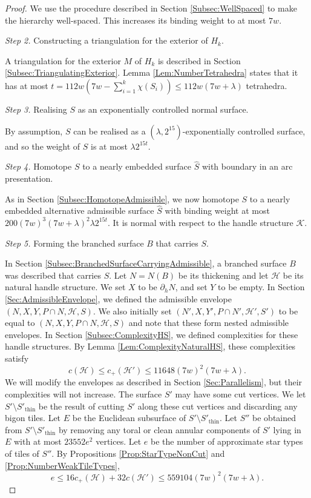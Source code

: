 \documentclass[oneside]{amsart}
\numberwithin{equation}{section}
\theoremstyle{plain}
\theoremstyle{definition}
\begin{document}
\begin{proof}
We use the procedure described in Section \ref{Subsec:WellSpaced} to make the hierarchy well-spaced.
This increases its binding weight to at most $7w$.

\medskip
\emph{Step 2.} Constructing a triangulation for the exterior of $H_k$.

A triangulation for the exterior $M$ of $H_k$ is described in Section \ref{Subsec:TriangulatingExterior}. Lemma \ref{Lem:NumberTetrahedra} states
that it has at most $t = 112 w (7w - \sum_{i=1}^k \chi(S_i) ) \leq 112 w (7w + \lambda)$ tetrahedra.

\medskip
\emph{Step 3.} Realising $S$ as an exponentially controlled normal surface.

By assumption, $S$ can be realised as a $(\lambda,2^{15})$-exponentially controlled surface,
and so the weight of $S$ is at most $\lambda 2^{15t}$.

\medskip
\emph{Step 4.} Homotope $S$ to a nearly embedded surface $\hat S$ with boundary
in an arc presentation.

As in Section \ref{Subsec:HomotopeAdmissible}, we now homotope $S$ to a nearly embedded alternative admissible surface $\hat S$
with binding weight at most $200(7w)^3 (7w + \lambda)^2 \lambda 2^{15t}$. It is normal with respect to the
handle structure $\mathcal{K}$.

\medskip
\emph{Step 5.} Forming the branched surface $B$ that carries $S$.

In Section \ref{Subsec:BranchedSurfaceCarryingAdmissible}, a branched surface $B$ was described that carries $S$.
Let $N = N(B)$ be its thickening and let $\mathcal{H}$ be its natural handle structure.
We set $X$ to be $\partial_h N$, and set $Y$ to be empty. In Section \ref{Sec:AdmissibleEnvelope},
we defined the admissible envelope $(N, X, Y, P \cap N, \mathcal{H}, S)$.
We also initially set $(N', X, Y', P \cap N', \mathcal{H}', S')$ to be equal to 
$(N, X, Y, P \cap N, \mathcal{H}, S)$ and note that these form nested admissible envelopes.
In Section \ref{Subsec:ComplexityHS}, we defined complexities for these handle structures.
By Lemma \ref{Lem:ComplexityNaturalHS}, these complexities satisfy
$$c(\mathcal{H}) \leq c_+(\mathcal{H}') \leq 11648 (7w)^2(7w+\lambda).$$
We will modify the envelopes as described in Section \ref{Sec:Parallelism},
but their complexities will not increase. The surface $S'$ may have some cut vertices.
We let $S' \setminus S'_{\mathrm{thin}}$ be the result of cutting $S'$ along these cut vertices and discarding
any bigon tiles. Let $E$ be the Euclidean subsurface of $S' \setminus S'_{\mathrm{thin}}$.
Let $S''$ be obtained from $S' \setminus S'_{\mathrm{thin}}$ by removing any toral or clean annular
components of $S'$ lying in $E$ with at most $23552e^2$ vertices. 
Let $e$ be the number of approximate star types of tiles of $S''$. 
By Propositions \ref{Prop:StarTypeNonCut} and \ref{Prop:NumberWeakTileTypes},
$$e \leq 16 c_+(\mathcal{H}) + 32c(\mathcal{H}')\leq 559104 (7w)^2(7w+\lambda).$$


\end{proof}
\end{document}
